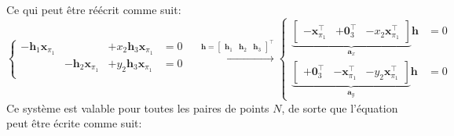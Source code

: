 \documentclass[../CSC_5RO17_TA_TP1.tex]{subfiles}
\begin{document}
Ce qui peut être réécrit comme suit:
\begin{equation*}
    \left\{
    \begin{aligned}
        -\mathbf{h}_{1}\mathbf{x}_{\pi_{1}} &  & +x_{2}\mathbf{h}_{3}\mathbf{x}_{\pi_{1}} &= 0\\
         & -\mathbf{h}_{2}\mathbf{x}_{\pi_{1}} & +y_{2}\mathbf{h}_{3}\mathbf{x}_{\pi_{1}} &= 0\\
    \end{aligned}
    \right.
    \quad\xrightarrow{\mathbf{h} =\begin{bmatrix}\mathbf{h}_{1} & \mathbf{h}_{2} & \mathbf{h}_{3}\end{bmatrix}^\intercal}
    \left\{
    \begin{aligned}
        \underbrace{
            \begin{bmatrix}
                -\mathbf{x}_{\pi_{1}}^{\intercal} & +\mathbf{0}_{3}^{\intercal} & -x_{2}\mathbf{x}_{\pi_{1}}^{\intercal}
            \end{bmatrix}
        }_{\mathbf{a}_{x}}
        \mathbf{h} &= 0\\
        \underbrace{
            \begin{bmatrix}
                +\mathbf{0}_{3}^{\intercal} & -\mathbf{x}_{\pi_{1}}^{\intercal} & -y_{2}\mathbf{x}_{\pi_{1}}^{\intercal}
            \end{bmatrix}
        }_{\mathbf{a}_{y}}
        \mathbf{h} &= 0
    \end{aligned}
    \right.
\end{equation*}
Ce système est valable pour toutes les paires de points $N$, de sorte que l'équation peut être écrite comme suit:
\end{document}

